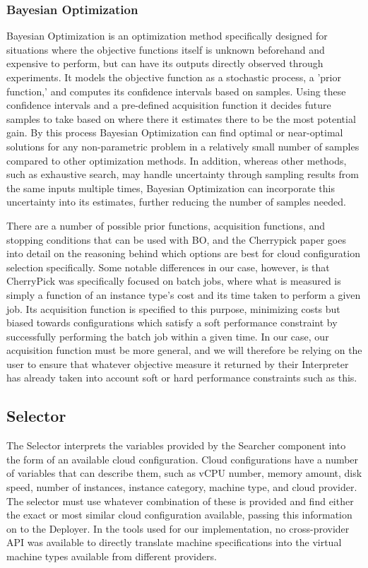 \documentclass{article}
\begin{document}
\subsubsection{Bayesian Optimization}
Bayesian Optimization is an optimization method specifically designed for situations where the objective functions itself is unknown beforehand and expensive to perform, but can have its outputs directly observed through experiments\cite{Snoek2012}. It models the objective function as a stochastic process, a 'prior function,' and computes its confidence intervals based on samples. Using these confidence intervals and a pre-defined acquisition function it decides future samples to take based on where there it estimates there to be the most potential gain. By this process Bayesian Optimization can find optimal or near-optimal solutions for any non-parametric problem in a relatively small number of samples compared to other optimization methods. In addition, whereas other methods, such as exhaustive search, may handle uncertainty through sampling results from the same inputs multiple times, Bayesian Optimization can incorporate this uncertainty into its estimates, further reducing the number of samples needed.

There are a number of possible prior functions, acquisition functions, and stopping conditions that can be used with BO, and the Cherrypick paper goes into detail on the reasoning behind which options are best for cloud configuration selection specifically\cite{Alipourfard2017}. Some notable differences in our case, however, is that CherryPick was specifically focused on batch jobs, where what is measured is simply a function of an instance type's cost and its time taken to perform a given job. Its acquisition function is specified to this purpose, minimizing costs but biased towards configurations which satisfy a soft performance constraint by successfully performing the batch job within a given time. In our case, our acquisition function must be more general, and we will therefore be relying on the user to ensure that whatever objective measure it returned by their Interpreter has already taken into account soft or hard performance constraints such as this.

\subsection{Selector}
The Selector interprets the variables provided by the Searcher component into the form of an available cloud configuration. Cloud configurations have a number of variables that can describe them, such as vCPU number, memory amount, disk speed, number of instances, instance category, machine type, and cloud provider. The selector must use whatever combination of these is provided and find either the exact or most similar cloud configuration available, passing this information on to the Deployer. In the tools used for our implementation, no cross-provider API was available to directly translate machine specifications into the virtual machine types available from different providers. 
\end{document}
